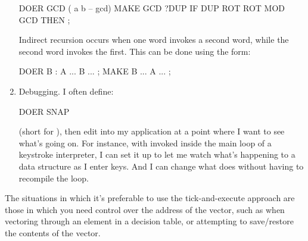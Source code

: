 \begin{enumerate}
\begin{Code}
DOER GCD ( a b -- gcd)
MAKE GCD  ?DUP  IF  DUP ROT ROT  MOD  GCD  THEN ;
\end{Code}
Indirect recursion occurs when one word invokes a second word, while the
second word invokes the first. This can be done using the form:

\begin{Code}
DOER B
: A  ... B ... ;
MAKE B  ... A ... ;
\end{Code}
\item Debugging. I often define:

\begin{Code}
DOER SNAP
\end{Code}
(short for ), then edit  into my
application at a point where I want to see what's going on. For
instance, with  invoked inside the main loop of a
keystroke interpreter, I can set it up to let me watch what's
happening to a data structure as I enter keys. And I can change what
 does without having to recompile the loop.
\end{enumerate}


The situations in which it's preferable to use the tick-and-execute
approach are those in which you need control over the address of the
vector, such as when vectoring through an element in a decision table, or
attempting to save/restore the contents of the vector.

